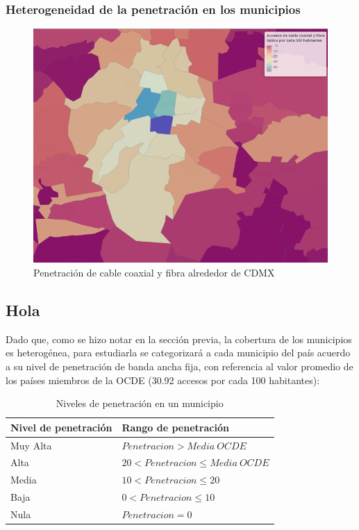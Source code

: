 \documentclass[9pt,twocolumn,twoside]{ilcss}
\begin{document}

\subsubsection{Heterogeneidad de la penetración en los municipios}

\begin{figure}[tbhp]
\centering
\includegraphics[width=0.5\linewidth]{images/pen_habs_cdmx.png}
\caption{Penetración de cable coaxial y fibra alrededor de CDMX}
\label{fig:pen_habs_cdmx}
\end{figure}

\subsection{Hola}

Dado que, como se hizo notar en la sección previa, la cobertura de los municipios es heterogénea, para estudiarla se categorizará a cada municipio del país acuerdo a su nivel de penetración de banda ancha fija, con referencia al valor promedio de los países miembros de la OCDE (30.92 accesos por cada 100 habitantes):
\begin{table}[tbhp]
	\centering
	\caption{Niveles de penetración en un municipio\label{table:clasifpen}}
	\begin{tabular}{@{}ll@{}}
		\toprule
		Nivel de penetración & Rango  de penetración            \\ \midrule
		Muy Alta  & $Penetracion > Media \ OCDE$         \\ 
		Alta    & $20 < Penetracion \leq Media \ OCDE$ \\ 
		Media    & $10 < Penetracion \leq 20$  \\ 
		Baja      & $0 < Penetracion \leq 10$  \\ 
		Nula      & $Penetracion =0$            \\ \bottomrule
	\end{tabular}
\end{table}
\end{document}
